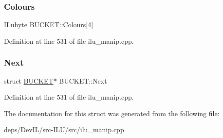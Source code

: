 \subsubsection{\texorpdfstring{Colours}{Colours}}
{\footnotesize\ttfamily I\+Lubyte B\+U\+C\+K\+E\+T\+::\+Colours\mbox{[}4\mbox{]}}



Definition at line 531 of file ilu\+\_\+manip.\+cpp.

\mbox{\label{structBUCKET_ac7c0f708d5b1174db140657e01bf8a54}} 
\subsubsection{\texorpdfstring{Next}{Next}}
{\footnotesize\ttfamily struct \hyperlink{structBUCKET}{B\+U\+C\+K\+ET}$\ast$ B\+U\+C\+K\+E\+T\+::\+Next}



Definition at line 531 of file ilu\+\_\+manip.\+cpp.



The documentation for this struct was generated from the following file\+:\begin{DoxyCompactItemize}
\item 
deps/\+Dev\+I\+L/src-\/\+I\+L\+U/src/ilu\+\_\+manip.\+cpp\end{DoxyCompactItemize}
